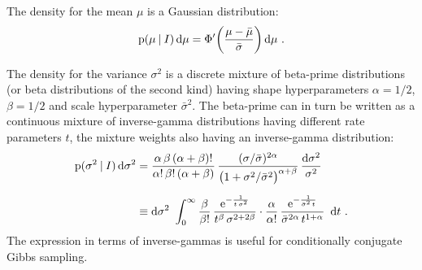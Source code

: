\documentclass[a4paper,12pt,%
onecolumn,oneside,article,%
british%
]{memoir}
\makeatletter
\def\sum{\DOTSI\sumop\slimits@}
\newcommand*{\e}{\ensuremath{\mathrm{e}}}
\newcommand*{\di}{\mathop{}\!\mathrm{d}}%
\newcommand*{\defd}{\coloneqq}
\newcommand*{\p}{\mathrm{p}}%
\renewcommand*{\|}[1][]{\nonscript\:#1\vert\nonscript\:\mathopen{}}
\newcommand*{\sect}{\S}%
\newcommand*{\muo}{\bar{\mu}}
\newcommand*{\sigmao}{\bar{\sigma}}
\newcommand*{\shapeh}{\alpha}
\newcommand*{\shapel}{\beta}
\makeatother
\begin{document}
The density for the mean $\mu$ is a Gaussian distribution:
\begin{equation}
  \label{eq:density_mu}
  \p(\mu\|I)\di \mu = \Phi'\biggl(\frac{\mu-\muo}{\sigmao}\biggr) \di\mu \ .
\end{equation}

\medskip

The density for the variance $\sigma^{2}$ is a discrete mixture of beta-prime distributions (or beta distributions of the second kind) \autocites[\sect\,25.7, 27.2]{johnsonetal1970b_r1995}{mcdonald1984} having shape hyperparameters $\shapeh=1/2$, $\shapel=1/2$ and scale hyperparameter $\sigmao^{2}$. The beta-prime can in turn be written as a continuous mixture of inverse-gamma distributions \autocites{dubey1970} having different rate parameters $t$, the mixture weights also having an inverse-gamma distribution:
\begin{equation}
  \label{eq:density_sigma}
  \begin{split}
    \p(\sigma^{2}\|I)\di\sigma^{2}
    &=
    \frac{\shapeh\,\shapel\, (\shapeh+\shapel)!}{\shapeh!\,\shapel!\,(\shapeh+\shapel)}
    \,\frac{(\sigma/\sigmao)^{2\shapeh}}
    {\bigl(1+\sigma^{2}/\sigmao^{2}\bigr)^{\shapeh+\shapel}}
    \,\frac{\di\sigma^{2}}{\sigma^{2}}
\\[2\jot]
  &\equiv
    \di\sigma^{2}\ 
    \int_{0}^{\infty}
    \frac{\shapel}{\shapel!}\,
    \frac{\e^{-\frac{1}{t\,\sigma^{2}}}}{
    t^{\shapel}\,\sigma^{2+2\shapel}
  }\cdot
    \frac{\shapeh}{\shapeh!}\,
    \frac{\e^{-\frac{1}{\sigmao^{2}\,t}}}{
    \sigmao^{2\shapeh}\,t^{1+\shapeh}
  }\ \di t \ .
\end{split}
\end{equation}
The expression in terms of inverse-gammas is useful for conditionally conjugate Gibbs sampling.
\end{document}
